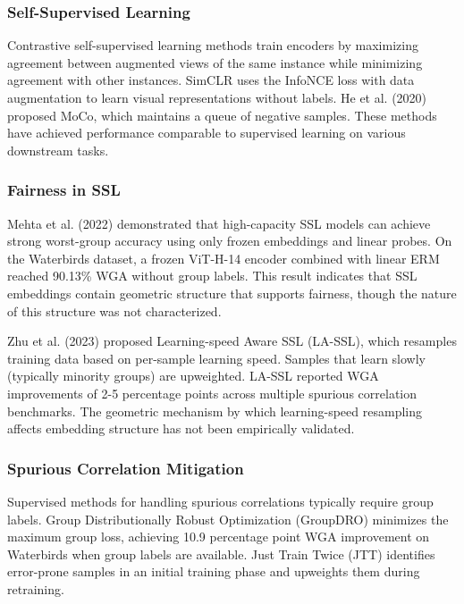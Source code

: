 
\subsubsection{Self-Supervised Learning}

Contrastive self-supervised learning methods train encoders by maximizing agreement between augmented views of the same instance while minimizing agreement with other instances. SimCLR \citep{chen2020simclr} uses the InfoNCE loss with data augmentation to learn visual representations without labels. He et al. (2020) proposed MoCo, which maintains a queue of negative samples. These methods have achieved performance comparable to supervised learning on various downstream tasks.

\subsubsection{Fairness in SSL}

Mehta et al. (2022) demonstrated that high-capacity SSL models can achieve strong worst-group accuracy using only frozen embeddings and linear probes. On the Waterbirds dataset, a frozen ViT-H-14 encoder combined with linear ERM reached 90.13\% WGA without group labels. This result indicates that SSL embeddings contain geometric structure that supports fairness, though the nature of this structure was not characterized.

Zhu et al. (2023) proposed Learning-speed Aware SSL (LA-SSL), which resamples training data based on per-sample learning speed. Samples that learn slowly (typically minority groups) are upweighted. LA-SSL reported WGA improvements of 2-5 percentage points across multiple spurious correlation benchmarks. The geometric mechanism by which learning-speed resampling affects embedding structure has not been empirically validated.

\subsubsection{Spurious Correlation Mitigation}

Supervised methods for handling spurious correlations typically require group labels. Group Distributionally Robust Optimization (GroupDRO) \citep{sagawa2020groupdro} minimizes the maximum group loss, achieving 10.9 percentage point WGA improvement on Waterbirds when group labels are available. Just Train Twice (JTT) \citep{liu2021jtt} identifies error-prone samples in an initial training phase and upweights them during retraining.

